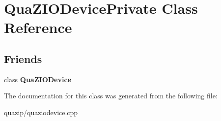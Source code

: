 \section{QuaZIODevicePrivate Class Reference}
\label{classQuaZIODevicePrivate}
\subsection*{Friends}
\begin{DoxyCompactItemize}
\item 
class {\bf QuaZIODevice}\label{classQuaZIODevicePrivate_afe813406e4e53e3ddc15c03262daac16}

\end{DoxyCompactItemize}


The documentation for this class was generated from the following file:\begin{DoxyCompactItemize}
\item 
quazip/quaziodevice.cpp\end{DoxyCompactItemize}
